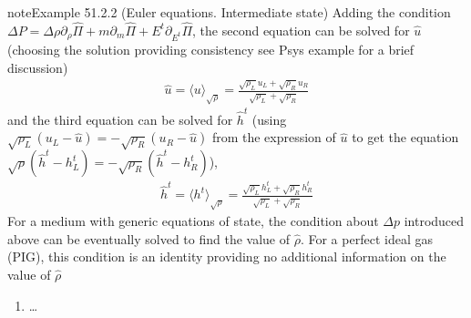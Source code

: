 \documentclass[letterpaper,10pt,english]{jupyterBook}
\begin{document}
\begin{sphinxadmonition}{note}{Example 51.2.2 (Euler equations. Intermediate state)}
\sphinxAtStartPar
Adding the condition \(\Delta P = \Delta \rho \partial_\rho \hat{\Pi} + m \partial_m \hat{\Pi} + E^t \partial_{E^t} \hat{\Pi}\), the second equation can be solved for \(\hat{u}\) (choosing the solution providing consistency \sphinxhyphen{} see P\sphinxhyphen{}sys example for a brief discussion)
\begin{equation*}
\begin{split}\hat{u} = \langle u \rangle_{\sqrt{\rho}} = \frac{ \sqrt{\rho_L} u_L + \sqrt{\rho_R} u_R }{\sqrt{\rho_L} + \sqrt{\rho_R}}\end{split}
\end{equation*}
\sphinxAtStartPar
and the third equation can be solved for \(\hat{h}^t\) (using \(\sqrt{\rho_L}(u_L - \hat{u}) = - \sqrt{\rho_R}(u_R - \hat{u})\) from the expression of \(\hat{u}\) to get the equation \(\sqrt{\rho}(\hat{h}^t - h^t_L) = - \sqrt{\rho_R}(\hat{h}^t - h^t_R)\)),
\begin{equation*}
\begin{split}\hat{h}^t = \langle h^t \rangle_{\sqrt{\rho}} = \frac{ \sqrt{\rho_L} h^t_L + \sqrt{\rho_R} h^t_R }{\sqrt{\rho_L} + \sqrt{\rho_R}}\end{split}
\end{equation*}
\sphinxAtStartPar
For a medium with generic equations of state, the condition about \(\Delta p\) introduced above can be eventually solved to find the value of \(\hat{\rho}\). For a perfect ideal gas (PIG), this condition is an identity providing no additional information on the value of \(\hat{\rho}\)
\begin{enumerate}
%
\setcounter{enumi}{1}
\item {} 
\sphinxAtStartPar
{} …

\end{enumerate}
\end{sphinxadmonition}
\end{document}
